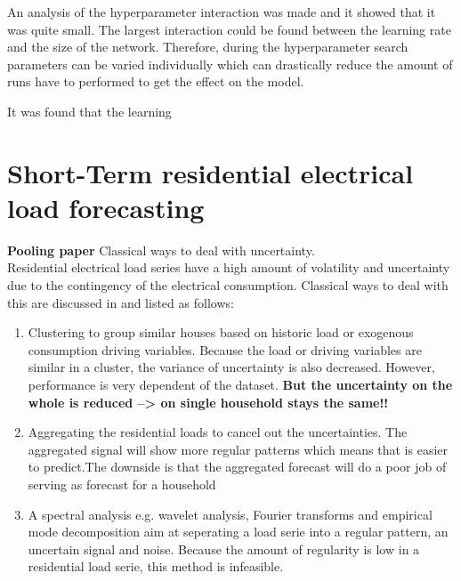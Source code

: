 An analysis of the hyperparameter interaction was made and it showed that it was quite small. The largest interaction could be found between the learning rate and the size of the network. Therefore, during the hyperparameter search parameters can be varied individually which can drastically reduce the amount of runs have to performed to get the effect on the model. 


It was found that the learning 

\section{Short-Term residential electrical load forecasting}
\textbf{Pooling paper}
Classical ways to deal with uncertainty.\\
Residential electrical load series have a high amount of volatility and uncertainty due to the contingency of the electrical consumption. Classical ways to deal with this are discussed in \cite{Shi2018} and listed as follows:
\begin{enumerate}
	\item Clustering to group similar houses based on historic load or exogenous consumption driving variables. Because the load or driving variables are similar in a cluster, the variance of uncertainty is also decreased. However, performance is very dependent of the dataset. \textbf{But the uncertainty on the whole is reduced --> on single household stays the same!!}
	\item Aggregating the residential loads to cancel out the uncertainties. The aggregated signal will show more regular patterns which means that is easier to predict.The downside is that the aggregated forecast will do a poor job of serving as forecast for a household
	\item A spectral analysis e.g. wavelet analysis, Fourier transforms and empirical mode decomposition aim at seperating a load serie into a regular pattern, an uncertain signal and noise. Because the amount of regularity is low in a residential load serie, this method is infeasible.
\end{enumerate}



